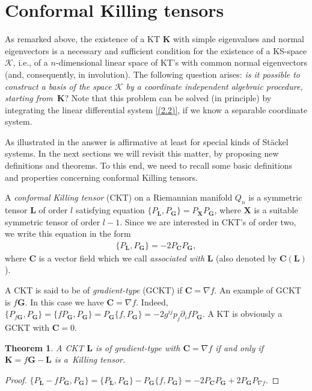 \documentclass[10pt,a4paper]{amsart}
\def\bs{\boldsymbol}
\numberwithin{equation}{section}
\newtheorem{Theorem}{Theorem}[section]
 { \theoremstyle{definition}
\newtheorem{Notation}[Theorem]{Notation}
\newtheorem{Example}[Theorem]{Example}
\newtheorem{Remark}[Theorem]{Remark}
\newtheorem{Remarks}[Theorem]{Remarks}
 }
\providecommand{\cal}{\mathcal}
\begin{document}
\section{Conformal Killing tensors}\label{section6}

As remarked above, the existence of a KT $\bs K$ with simple eigenvalues and normal eigenvectors is a necessary and suf\/f\/icient condition for the existence of a KS-space $\cal K$, i.e., of a $n$-dimensional linear space of KT's with common normal eigenvectors (and, consequently, in involution). The following question arises: {\it is it possible to construct a basis of the space $\cal K$ by a coordinate independent algebraic procedure, starting from~$\bs K$}? Note that this problem can be solved (in principle) by integrating the linear dif\/ferential system \eqref{(2.2)}, if we know a separable coordinate system.

As illustrated in \cite{Benenti-1992b} the answer is af\/f\/irmative at least for special kinds of St\"ackel systems. In the next sections we will revisit this matter, by proposing new def\/initions and theorems. To this end, we need to recall some basic def\/initions and properties concerning conformal Killing tensors.

A {\it conformal Killing tensor} (CKT) on a Riemannian manifold $Q_n$ is a symmetric tensor $\bs L$ of order $l$ satisfying equation $\{P_{\bs L},P_{\bs G}\}=P_{\bs X} P_{\bs G}$, where $\bs X$ is a suitable symmetric tensor of order $l-1$. Since we are interested in CKT's of order two, we write this equation in the form
\begin{gather}
\{P_{\bs L},P_{\bs G}\}= -2 P_{\bs C} P_{\bs G},
\label{(6.1)}
\end{gather}
where $\bs C$ is a vector f\/ield which we call {\it associated with} $\bs L$ (also denoted by $\bs C(\bs L)$).

A CKT is said to be of {\it gradient-type} (GCKT) if $\bs C=\nabla f$. An example of GCKT is $f \bs G$. In this case we have $\bs C=\nabla f$. Indeed, $\{P_{f\bs G},P_{\bs G}\}=\{fP_{\bs G},P_{\bs G}\}=
P_{\bs G}\{f,P_{\bs G}\}= -2g^{ij}p_j\partial_if P_{\bs G}$.
A KT is obviously a GCKT with $\bs C=0$.

\begin{Theorem} \label{t:6.1}
A CKT $\bs L$ is of gradient-type with $\bs C=\nabla f$ if and only if
$\bs K=f \bs G-\bs L$ is a~Killing tensor.
\end{Theorem}

\begin{proof} $\{P_{\bs L}-fP_{\bs G}, P_{\bs G}\}=\{P_{\bs L},P_{\bs G}\}-P_{\bs G}\{f,P_{\bs G}\}= -2P_{\bs C}P_{\bs G}+2P_{\bs G}P_{\nabla f}$.
\end{proof}
\end{document}
